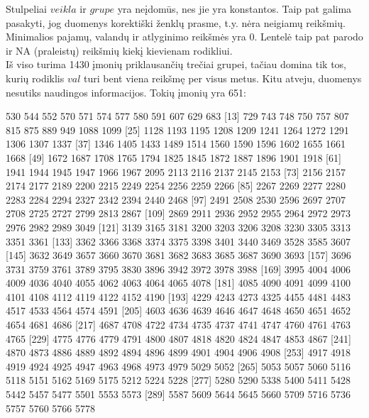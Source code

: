 \documentclass[a4paper]{article}
\begin{document}
Stulpeliai $veikla$ ir $grupe$ yra neįdomūs, nes jie yra
konstantos. Taip pat galima pasakyti, jog duomenys korektiški ženklų
prasme, t.y. nėra neigiamų reikšmių. Minimalios pajamų, valandų ir
atlyginimo reikšmės yra 0. Lentelė taip pat parodo ir NA (praleistų)
reikšmių kiekį kievienam rodikliui.\\
Iš viso turima 1430 įmonių priklausančių trečiai grupei, tačiau domina
tik tos, kurių rodiklis $val$ turi bent viena reikšmę per visus metus.
Kitu atveju, duomenys nesutiks naudingos informacijos. Tokių įmonių
yra 651:
\begin{Schunk}
\begin{Soutput}
  [1]   530   544   552   570   571   574   577   580   591   607   629   683
 [13]   729   743   748   750   757   807   815   875   889   949  1088  1099
 [25]  1128  1193  1195  1208  1209  1241  1264  1272  1291  1306  1307  1337
 [37]  1346  1405  1433  1489  1514  1560  1590  1596  1602  1655  1661  1668
 [49]  1672  1687  1708  1765  1794  1825  1845  1872  1887  1896  1901  1918
 [61]  1941  1944  1945  1947  1966  1967  2095  2113  2116  2137  2145  2153
 [73]  2156  2157  2174  2177  2189  2200  2215  2249  2254  2256  2259  2266
 [85]  2267  2269  2277  2280  2283  2284  2294  2327  2342  2394  2440  2468
 [97]  2491  2508  2530  2596  2697  2707  2708  2725  2727  2799  2813  2867
[109]  2869  2911  2936  2952  2955  2964  2972  2973  2976  2982  2989  3049
[121]  3139  3165  3181  3200  3203  3206  3208  3230  3305  3313  3351  3361
[133]  3362  3366  3368  3374  3375  3398  3401  3440  3469  3528  3585  3607
[145]  3632  3649  3657  3660  3670  3681  3682  3683  3685  3687  3690  3693
[157]  3696  3731  3759  3761  3789  3795  3830  3896  3942  3972  3978  3988
[169]  3995  4004  4006  4009  4036  4040  4055  4062  4063  4064  4065  4078
[181]  4085  4090  4091  4099  4100  4101  4108  4112  4119  4122  4152  4190
[193]  4229  4243  4273  4325  4455  4481  4483  4517  4533  4564  4574  4591
[205]  4603  4636  4639  4646  4647  4648  4650  4651  4652  4654  4681  4686
[217]  4687  4708  4722  4734  4735  4737  4741  4747  4760  4761  4763  4765
[229]  4775  4776  4779  4791  4800  4807  4818  4820  4824  4847  4853  4867
[241]  4870  4873  4886  4889  4892  4894  4896  4899  4901  4904  4906  4908
[253]  4917  4918  4919  4924  4925  4947  4963  4968  4973  4979  5029  5052
[265]  5053  5057  5060  5116  5118  5151  5162  5169  5175  5212  5224  5228
[277]  5280  5290  5338  5400  5411  5428  5442  5457  5477  5501  5553  5573
[289]  5587  5609  5644  5645  5660  5709  5716  5736  5757  5760  5766  5778

\end{Soutput}
\end{Schunk}
\end{document}
